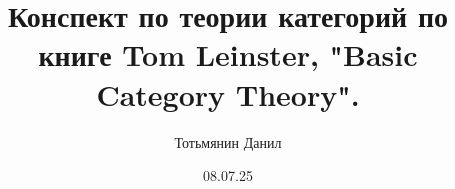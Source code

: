 \documentclass[12pt, a4paper, oneside]{memoir}
\title{Конспект по теории категорий по книге Tom Leinster, "Basic Category Theory".}
\author{Тотьмянин Данил}
\date{08.07.25}
\begin{document}
\begin{titlingpage}
    \maketitle
\end{titlingpage}


\tableofcontents



\end{document}

